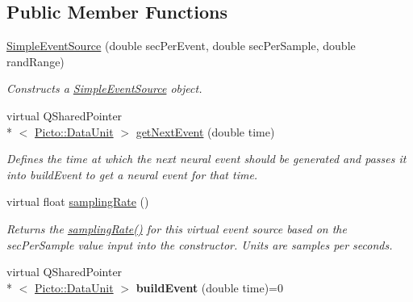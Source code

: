 \subsection*{Public Member Functions}
\begin{DoxyCompactItemize}
\item 
\hyperlink{class_simple_event_source_a90a6e1d9583aa48f907188d2c7dc4df6}{Simple\-Event\-Source} (double sec\-Per\-Event, double sec\-Per\-Sample, double rand\-Range)
\begin{DoxyCompactList}\small\item\em Constructs a \hyperlink{class_simple_event_source}{Simple\-Event\-Source} object. \end{DoxyCompactList}\item 
virtual Q\-Shared\-Pointer\\*
$<$ \hyperlink{class_picto_1_1_data_unit}{Picto\-::\-Data\-Unit} $>$ \hyperlink{class_simple_event_source_ad61883e129671a03003867cb7314a504}{get\-Next\-Event} (double time)
\begin{DoxyCompactList}\small\item\em Defines the time at which the next neural event should be generated and passes it into build\-Event to get a neural event for that time. \end{DoxyCompactList}\item 
\hypertarget{class_simple_event_source_af095e72f6d1b1bf049635a603a0b610f}{virtual float \hyperlink{class_simple_event_source_af095e72f6d1b1bf049635a603a0b610f}{sampling\-Rate} ()}\label{class_simple_event_source_af095e72f6d1b1bf049635a603a0b610f}

\begin{DoxyCompactList}\small\item\em Returns the \hyperlink{class_simple_event_source_af095e72f6d1b1bf049635a603a0b610f}{sampling\-Rate()} for this virtual event source based on the sec\-Per\-Sample value input into the constructor. Units are samples per seconds. \end{DoxyCompactList}\item 
\hypertarget{class_simple_event_source_ad49239334b751f2d10670d5ed58d922f}{virtual Q\-Shared\-Pointer\\*
$<$ \hyperlink{class_picto_1_1_data_unit}{Picto\-::\-Data\-Unit} $>$ {\bfseries build\-Event} (double time)=0}\label{class_simple_event_source_ad49239334b751f2d10670d5ed58d922f}

\end{DoxyCompactItemize}
